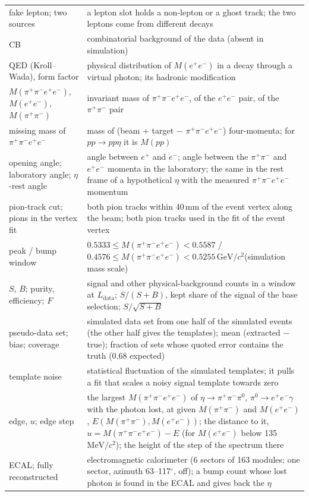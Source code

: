 \documentclass[11pt,a4paper]{article}
\newcommand{\pip}{\ensuremath{\pi^{+}}\xspace}
\newcommand{\pim}{\ensuremath{\pi^{-}}\xspace}
\newcommand{\piz}{\ensuremath{\pi^{0}}\xspace}
\newcommand{\ee}{\ensuremath{e^{+}e^{-}}\xspace}
\newcommand{\pipi}{\ensuremath{\pi^{+}\pi^{-}}\xspace}
\newcommand{\ppee}{\ensuremath{\pi^{+}\pi^{-}e^{+}e^{-}}\xspace}
\newcommand{\Mfour}{\ensuremath{M(\pi^{+}\pi^{-}e^{+}e^{-})}\xspace}
\newcommand{\Mee}{\ensuremath{M(e^{+}e^{-})}\xspace}
\newcommand{\Mpipi}{\ensuremath{M(\pi^{+}\pi^{-})}\xspace}
\newcommand{\GeVcc}{\ensuremath{\mathrm{GeV}/c^{2}}\xspace}
\newcommand{\MeVcc}{\ensuremath{\mathrm{MeV}/c^{2}}\xspace}
\newcommand{\Ldata}{\ensuremath{L_{\mathrm{data}}}\xspace}
\begin{document}
{\begin{longtable}{@{}>{\raggedright\arraybackslash}p{3.3cm} >{\raggedright\arraybackslash}p{\dimexpr\textwidth-3.3cm-2\tabcolsep\relax}@{}}
fake lepton; two sources & a lepton slot holds a non-lepton or a ghost track; the two leptons come from different decays \\
CB & combinatorial background of the data (absent in simulation) \\
QED (Kroll--Wada), form factor & physical distribution of \Mee in a decay through a virtual photon; its hadronic modification \\
\Mfour, \Mee, \Mpipi & invariant mass of \ppee, of the \ee pair, of the \pipi pair \\
missing mass of \ppee & mass of (beam + target $-$ \pip\pim$e^+e^-$) four-momenta; for $pp\to pp\eta$ it is $M(pp)$ \\
opening angle; laboratory angle; $\eta$-rest angle & angle between $e^+$ and $e^-$; angle between the \pipi and \ee momenta in the laboratory; the same in the rest frame of a hypothetical $\eta$ with the measured \ppee momentum \\
pion-track cut; pions in the vertex fit & both pion tracks within 40\,mm of the event vertex along the beam; both pion tracks used in the fit of the event vertex \\
peak / bump window & $0.5333\le\Mfour<0.5587$ / $0.4576\le\Mfour<0.5255$\,\GeVcc (simulation mass scale) \\
$S$, $B$; purity, efficiency; $F$ & signal and other physical-background counts in a window at \Ldata; $S/(S+B)$, kept share of the signal of the base selection; $S/\sqrt{S+B}$ \\
pseudo-data set; bias; coverage & simulated data set from one half of the simulated events (the other half gives the templates); mean (extracted $-$ true); fraction of sets whose quoted error contains the truth (0.68 expected) \\
template noise & statistical fluctuation of the simulated templates; it pulls a fit that scales a noisy signal template towards zero \\
edge, $u$; edge step & the largest \Mfour of $\eta\to\pipi\piz$, $\piz\to\ee\gamma$ with the photon lost, at given \Mpipi and \Mee, $E(\Mpipi,\Mee)$; the distance to it, $u=\Mfour-E$ (for \Mee below 135\,\MeVcc); the height of the step of the spectrum there \\
ECAL; fully reconstructed & electromagnetic calorimeter (6 sectors of 163 modules; one sector, azimuth 63--117$^\circ$, off); a bump count whose lost photon is found in the ECAL and gives back the $\eta$ \\
\bottomrule
\end{longtable}
}
\end{document}
